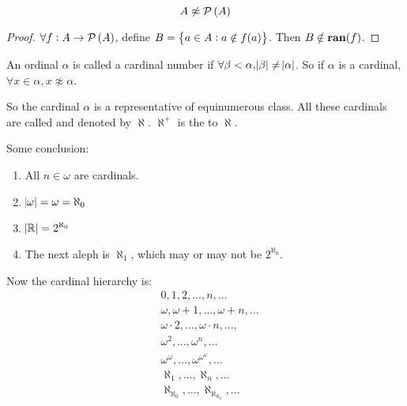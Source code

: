 \begin{theorem}
    \begin{equation}
        A \not\approx \mathcal{P}\left( A \right)
    \end{equation}    
\end{theorem}
\begin{proof}
    $\forall f: A \rightarrow \mathcal{P}\left( A \right)$, define $B = \set{ a \in A: a \notin f(a)}$. Then $B\notin \mathbf{ran}(f)$.
\end{proof}

\begin{definition}
    An ordinal $\alpha$ is called a cardinal number if $\forall \beta < \alpha, \abs{\beta} \neq \abs{\alpha}$. So if $\alpha$ is a cardinal, $\forall x \in \alpha, x \not\approx \alpha$.
\end{definition}

So the cardinal $\alpha$ is a representative of equinumerous class. All these cardinals are called  and denoted by $\aleph$. $\aleph^{+}$ is the  to $\aleph$.

Some conclusion:
\begin{enumerate}
    \item All $n \in \omega$ are cardinals.
    \item $\abs{\omega} = \omega = \aleph_0$
    \item $\abs{\mathbb{R}} = 2^{\aleph_0}$
    \item The next aleph is $\aleph_1$, which may or may not be $2^{\aleph_0}$.
\end{enumerate}

Now the cardinal hierarchy is:
\begin{equation}
\begin{aligned}
    & 0,1,2,..., n, ... \\
    & \omega, \omega +1, ..., \omega + n, ... \\
    & \omega \cdot 2, ...,  \omega \cdot n , ..., \\
    & \omega^2, ..., \omega^n, ... \\
    & \omega^\omega, ..., \omega^{\omega^\omega}, ... \\
    & \aleph_1, ..., \aleph_n, ... \\
    & \aleph_{\aleph_0}, ... , \aleph_{\aleph_{\aleph_0}}, ...
\end{aligned}
\end{equation}


